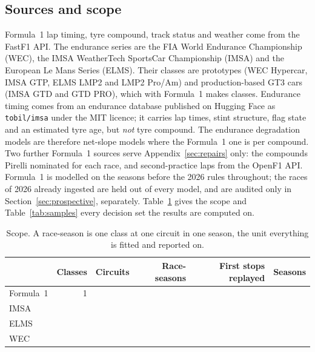 \documentclass[11pt,a4paper]{article}
\begin{document}
\subsection{Sources and scope}

Formula~1 lap timing, tyre compound, track status and weather come from the
FastF1 API. The endurance series are the FIA World Endurance Championship
(WEC), the IMSA WeatherTech SportsCar Championship (IMSA) and the European Le
Mans Series (ELMS). Their classes are prototypes (WEC Hypercar, IMSA GTP, ELMS
LMP2 and LMP2 Pro/Am) and production-based GT3 cars (IMSA GTD and GTD PRO),
which with Formula~1 makes \NClasses{} classes. Endurance timing comes from an endurance database
published on Hugging Face as \texttt{tobil/imsa} under the MIT licence; it
carries lap times, stint structure, flag state and an estimated tyre age, but
\emph{not} tyre compound. The endurance degradation models are therefore
net-slope models where the Formula~1 one is per compound. Two further Formula~1
sources serve Appendix~\ref{sec:repairs} only: the compounds Pirelli nominated
for each race, and second-practice laps from the OpenF1 API. Formula~1 is
modelled on the seasons before the 2026 rules throughout; the
\NRacesFoneHeldOut{} races of 2026 already ingested are held out of every model,
and are audited only in Section~\ref{sec:prospective}, separately. Table~\ref{tab:scope} gives the scope and Table~\ref{tab:samples}
every decision set the results are computed on.

\begin{table}[htbp]
\centering
\caption{Scope. A race-season is one class at one circuit in one season, the
unit everything is fitted and reported on.}
\label{tab:scope}
\begin{tabular}{lrrrrl}
\toprule
& Classes & Circuits & Race-seasons & First stops replayed & Seasons \\
\midrule
Formula~1 & 1 & \NCircuitsFone{} & \NRacesFone{} & \NDecisionsFone{} & \SeasonsFone{} \\
IMSA      & \NClassesImsa{} & \NCircuitsImsa{} & \NRacesImsa{} & \NDecisionsImsa{} & \SeasonsImsa{} \\
ELMS      & \NClassesElms{} & \NCircuitsElms{} & \NRacesElms{} & \NDecisionsElms{} & \SeasonsElms{} \\
WEC       & \NClassesWec{} & \NCircuitsWec{} & \NRacesWec{} & \NDecisionsWec{} & \SeasonsWec{} \\
\bottomrule
\end{tabular}
\end{table}
\end{document}

